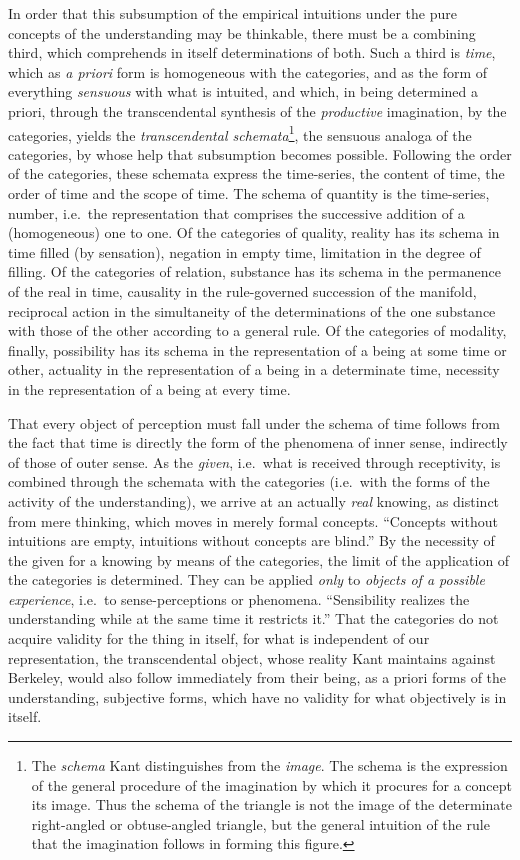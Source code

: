 In order that this subsumption of the empirical intuitions under the
pure concepts of the understanding may be thinkable, there must be a
combining third, which comprehends in itself determinations of both. Such
a third is \emph{time}, which as \emph{a priori} form is homogeneous with
the categories, and as the form of everything \emph{sensuous} with what is
intuited, and which, in being determined a priori,
 \setcounter{footnote}{0}
through the transcendental synthesis of the \emph{productive}
imagination, by the categories, yields the \emph{transcendental
schemata}\footnote{The \emph{schema} Kant distinguishes from the
\emph{image}. The schema is the expression of the general procedure of
the imagination by which it procures for a concept its image. Thus the
schema of the triangle is not the image of the determinate right-angled
or obtuse-angled triangle, but the general intuition of the rule that the
imagination follows in forming this figure.}, the sensuous analoga of the
categories, by whose help that subsumption becomes possible. Following
the order of the categories, these schemata express the time-series, the
content of time, the order of time and the scope of time. The schema of
quantity is the time-series, number, i.e.\ the representation that
comprises the successive addition of a (homogeneous) one to one. Of the
categories of quality, reality has its schema in time filled (by
sensation), negation in empty time, limitation in the degree of filling.
Of the categories of relation, substance has its schema in the permanence
of the real in time, causality in the rule-governed succession of the
manifold, reciprocal action in the simultaneity of the determinations of
the one substance with those of the other according to a general rule. Of
the categories of modality, finally, possibility has its schema in the
representation of a being at some time or other, actuality in the
representation of a being in a determinate time, necessity in the
representation of a being at every time.

That every object of perception must fall under the schema of time
follows from the fact that time is directly the form of the phenomena of
inner sense, indirectly of those of outer sense. As the \emph{given},
i.e.\ what is received through receptivity, is combined through the
schemata with the categories (i.e.\ with the forms of the activity of the
understanding), we arrive at an actually \emph{real} knowing, as distinct
from mere thinking, which moves in merely formal concepts. ``Concepts
without intuitions are empty, intuitions without concepts are blind.'' By
the necessity of the given for a knowing by means of the
categories, the limit of the application of the categories is determined.
They can be applied \emph{only} to \emph{objects of a possible
experience}, i.e.\ to sense-perceptions or phenomena. ``Sensibility
realizes the understanding while at the same time it restricts it.'' That
the categories do not acquire validity for the thing in itself, for what
is independent of our representation, the transcendental object, whose
reality Kant maintains against Berkeley, would also follow immediately
from their being, as a priori forms of the understanding, subjective
forms, which have no validity for what objectively is in itself.

